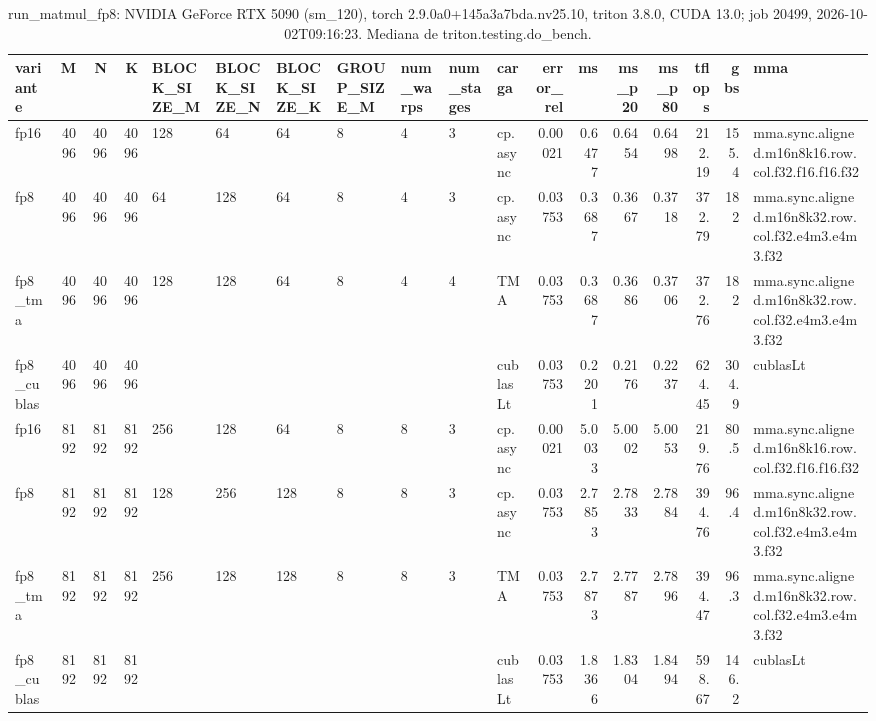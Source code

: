 \begin{table}[htbp]
  \centering\small
  \begin{tabular}{lrrrlllllllrrrrrrl}
    \toprule
    variante & M & N & K & BLOCK\_SIZE\_M & BLOCK\_SIZE\_N & BLOCK\_SIZE\_K & GROUP\_SIZE\_M & num\_warps & num\_stages & carga & error\_rel & ms & ms\_p20 & ms\_p80 & tflops & gbs & mma \\
    \midrule
    fp16 & 4096 & 4096 & 4096 & 128 & 64 & 64 & 8 & 4 & 3 & cp.async & 0.00021 & 0.6477 & 0.6454 & 0.6498 & 212.19 & 155.4 & mma.sync.aligned.m16n8k16.row.col.f32.f16.f16.f32 \\
    fp8 & 4096 & 4096 & 4096 & 64 & 128 & 64 & 8 & 4 & 3 & cp.async & 0.03753 & 0.3687 & 0.3667 & 0.3718 & 372.79 & 182 & mma.sync.aligned.m16n8k32.row.col.f32.e4m3.e4m3.f32 \\
    fp8\_tma & 4096 & 4096 & 4096 & 128 & 128 & 64 & 8 & 4 & 4 & TMA & 0.03753 & 0.3687 & 0.3686 & 0.3706 & 372.76 & 182 & mma.sync.aligned.m16n8k32.row.col.f32.e4m3.e4m3.f32 \\
    fp8\_cublas & 4096 & 4096 & 4096 &  &  &  &  &  &  & cublasLt & 0.03753 & 0.2201 & 0.2176 & 0.2237 & 624.45 & 304.9 & cublasLt \\
    fp16 & 8192 & 8192 & 8192 & 256 & 128 & 64 & 8 & 8 & 3 & cp.async & 0.00021 & 5.0033 & 5.0002 & 5.0053 & 219.76 & 80.5 & mma.sync.aligned.m16n8k16.row.col.f32.f16.f16.f32 \\
    fp8 & 8192 & 8192 & 8192 & 128 & 256 & 128 & 8 & 8 & 3 & cp.async & 0.03753 & 2.7853 & 2.7833 & 2.7884 & 394.76 & 96.4 & mma.sync.aligned.m16n8k32.row.col.f32.e4m3.e4m3.f32 \\
    fp8\_tma & 8192 & 8192 & 8192 & 256 & 128 & 128 & 8 & 8 & 3 & TMA & 0.03753 & 2.7873 & 2.7787 & 2.7896 & 394.47 & 96.3 & mma.sync.aligned.m16n8k32.row.col.f32.e4m3.e4m3.f32 \\
    fp8\_cublas & 8192 & 8192 & 8192 &  &  &  &  &  &  & cublasLt & 0.03753 & 1.8366 & 1.8304 & 1.8494 & 598.67 & 146.2 & cublasLt \\
    \bottomrule
  \end{tabular}
  \caption{run\_matmul\_fp8: NVIDIA GeForce RTX 5090 (sm\_120), torch 2.9.0a0+145a3a7bda.nv25.10, triton 3.8.0, CUDA 13.0; job 20499, 2026-10-02T09:16:23. Mediana de triton.testing.do\_bench.}
  \label{tab:run-matmul-fp8}
\end{table}
